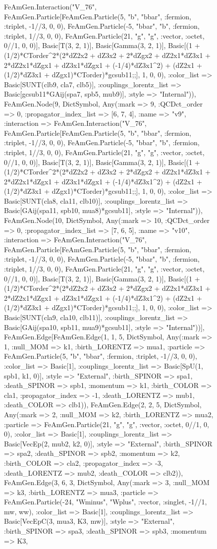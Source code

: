 \documentclass{revtex4}
\begin{document}
\begin{figure}[!htb]
\begin{center}
{FeAmGen.Interaction("V_76", FeAmGen.Particle[FeAmGen.Particle(5, "b", "bbar", :fermion, :triplet, -1//3, 0, 0), FeAmGen.Particle(-5, "bbar", "b", :fermion, :triplet, 1//3, 0, 0), FeAmGen.Particle(21, "g", "g", :vector, :octet, 0//1, 0, 0)], Basic[T(3, 2, 1)], Basic[Gamma(3, 2, 1)], Basic[(1 + (1/2)*CTorder^2*(2*dZ2x2 + dZ3x2 + 2*dZgx2 + dZ2x1*dZ3x1 + 2*dZ2x1*dZgx1 + dZ3x1*dZgx1 + (-1/4)*dZ3x1^2) + (dZ2x1 + (1/2)*dZ3x1 + dZgx1)*CTorder)*gcsub11;;], 1, 0, 0), :color_list => Basic[SUNT(clb9, cla7, clb5)], :couplings_lorentz_list => Basic[gcsub11*GAij(spa7, spb5, mub9)], :style => "Internal")), FeAmGen.Node(9, Dict{Symbol, Any}(:mark => 9, :QCDct_order => 0, :propagator_index_list => [6, 7, 4], :name => "v9", :interaction => FeAmGen.Interaction("V_76", FeAmGen.Particle[FeAmGen.Particle(5, "b", "bbar", :fermion, :triplet, -1//3, 0, 0), FeAmGen.Particle(-5, "bbar", "b", :fermion, :triplet, 1//3, 0, 0), FeAmGen.Particle(21, "g", "g", :vector, :octet, 0//1, 0, 0)], Basic[T(3, 2, 1)], Basic[Gamma(3, 2, 1)], Basic[(1 + (1/2)*CTorder^2*(2*dZ2x2 + dZ3x2 + 2*dZgx2 + dZ2x1*dZ3x1 + 2*dZ2x1*dZgx1 + dZ3x1*dZgx1 + (-1/4)*dZ3x1^2) + (dZ2x1 + (1/2)*dZ3x1 + dZgx1)*CTorder)*gcsub11;;], 1, 0, 0), :color_list => Basic[SUNT(cla8, cla11, clb10)], :couplings_lorentz_list => Basic[GAij(spa11, spb10, mua8)*gcsub11], :style => "Internal")), FeAmGen.Node(10, Dict{Symbol, Any}(:mark => 10, :QCDct_order => 0, :propagator_index_list => [7, 6, 5], :name => "v10", :interaction => FeAmGen.Interaction("V_76", FeAmGen.Particle[FeAmGen.Particle(5, "b", "bbar", :fermion, :triplet, -1//3, 0, 0), FeAmGen.Particle(-5, "bbar", "b", :fermion, :triplet, 1//3, 0, 0), FeAmGen.Particle(21, "g", "g", :vector, :octet, 0//1, 0, 0)], Basic[T(3, 2, 1)], Basic[Gamma(3, 2, 1)], Basic[(1 + (1/2)*CTorder^2*(2*dZ2x2 + dZ3x2 + 2*dZgx2 + dZ2x1*dZ3x1 + 2*dZ2x1*dZgx1 + dZ3x1*dZgx1 + (-1/4)*dZ3x1^2) + (dZ2x1 + (1/2)*dZ3x1 + dZgx1)*CTorder)*gcsub11;;], 1, 0, 0), :color_list => Basic[SUNT(cla9, cla10, clb11)], :couplings_lorentz_list => Basic[GAij(spa10, spb11, mua9)*gcsub11], :style => "Internal"))], FeAmGen.Edge[FeAmGen.Edge(1, 1, 5, Dict{Symbol, Any}(:mark => 1, :null_MOM => k1, :birth_LORENTZ => mua1, :particle => FeAmGen.Particle(5, "b", "bbar", :fermion, :triplet, -1//3, 0, 0), :color_list => Basic[1], :couplings_lorentz_list => Basic[SpU(1, spb1, k1, 0)], :style => "External", :birth_SPINOR => spa1, :death_SPINOR => spb1, :momentum => k1, :birth_COLOR => cla1, :propagator_index => -1, :death_LORENTZ => mub1, :death_COLOR => clb1)), FeAmGen.Edge(2, 2, 5, Dict{Symbol, Any}(:mark => 2, :null_MOM => k2, :birth_LORENTZ => mua2, :particle => FeAmGen.Particle(21, "g", "g", :vector, :octet, 0//1, 0, 0), :color_list => Basic[1], :couplings_lorentz_list => Basic[VecEp(2, mub2, k2, 0)], :style => "External", :birth_SPINOR => spa2, :death_SPINOR => spb2, :momentum => k2, :birth_COLOR => cla2, :propagator_index => -3, :death_LORENTZ => mub2, :death_COLOR => clb2)), FeAmGen.Edge(3, 6, 3, Dict{Symbol, Any}(:mark => 3, :null_MOM => k3, :birth_LORENTZ => mua3, :particle => FeAmGen.Particle(-24, "Wminus", "Wplus", :vector, :singlet, -1//1, mw, ww), :color_list => Basic[1], :couplings_lorentz_list => Basic[VecEpC(3, mua3, K3, mw)], :style => "External", :birth_SPINOR => spa3, :death_SPINOR => spb3, :momentum => K3, }
\end{center}
\end{figure}
\end{document}
